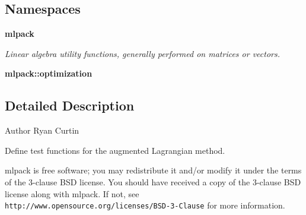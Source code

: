 \subsection*{Namespaces}
\begin{DoxyCompactItemize}
\item 
 {\bf mlpack}
\begin{DoxyCompactList}\small\item\em Linear algebra utility functions, generally performed on matrices or vectors. \end{DoxyCompactList}\item 
 {\bf mlpack\+::optimization}
\end{DoxyCompactItemize}


\subsection{Detailed Description}
\begin{DoxyAuthor}{Author}
Ryan Curtin
\end{DoxyAuthor}
Define test functions for the augmented Lagrangian method.

mlpack is free software; you may redistribute it and/or modify it under the terms of the 3-\/clause B\+SD license. You should have received a copy of the 3-\/clause B\+SD license along with mlpack. If not, see {\tt http\+://www.\+opensource.\+org/licenses/\+B\+S\+D-\/3-\/\+Clause} for more information. 